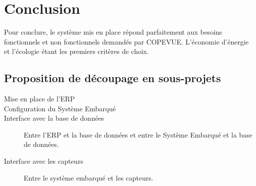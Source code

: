 \section{Conclusion}

Pour conclure, le système mis en place répond parfaitement aux besoins 
fonctionnels et non fonctionnels demandés par COPEVUE. L'économie d'énergie et 
l'écologie étant les premiers critères de choix.

\subsection{Proposition de découpage en sous-projets}

\begin{description}
\item[Mise en place de l'ERP] 
\item[Configuration du Système Embarqué] 
\item[Interface avec la base de données] Entre l'ERP et la base de données et 
entre le Système Embarqué et la base de données.
\item[Interface avec les capteurs] Entre le système embarqué et les capteurs.
\end{description}

